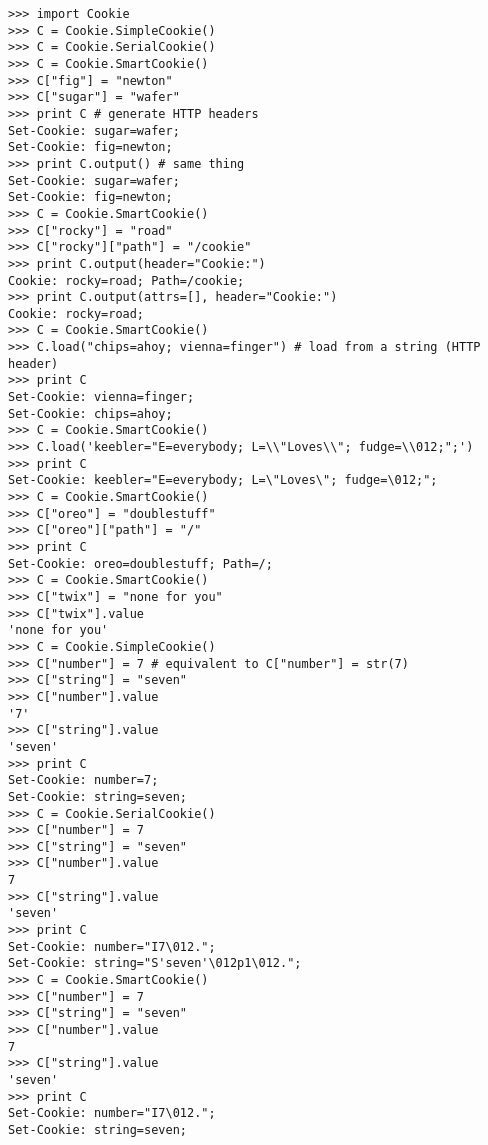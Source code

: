 \begin{verbatim}
>>> import Cookie
>>> C = Cookie.SimpleCookie()
>>> C = Cookie.SerialCookie()
>>> C = Cookie.SmartCookie()
>>> C["fig"] = "newton"
>>> C["sugar"] = "wafer"
>>> print C # generate HTTP headers
Set-Cookie: sugar=wafer;
Set-Cookie: fig=newton;
>>> print C.output() # same thing
Set-Cookie: sugar=wafer;
Set-Cookie: fig=newton;
>>> C = Cookie.SmartCookie()
>>> C["rocky"] = "road"
>>> C["rocky"]["path"] = "/cookie"
>>> print C.output(header="Cookie:")
Cookie: rocky=road; Path=/cookie;
>>> print C.output(attrs=[], header="Cookie:")
Cookie: rocky=road;
>>> C = Cookie.SmartCookie()
>>> C.load("chips=ahoy; vienna=finger") # load from a string (HTTP header)
>>> print C
Set-Cookie: vienna=finger;
Set-Cookie: chips=ahoy;
>>> C = Cookie.SmartCookie()
>>> C.load('keebler="E=everybody; L=\\"Loves\\"; fudge=\\012;";')
>>> print C
Set-Cookie: keebler="E=everybody; L=\"Loves\"; fudge=\012;";
>>> C = Cookie.SmartCookie()
>>> C["oreo"] = "doublestuff"
>>> C["oreo"]["path"] = "/"
>>> print C
Set-Cookie: oreo=doublestuff; Path=/;
>>> C = Cookie.SmartCookie()
>>> C["twix"] = "none for you"
>>> C["twix"].value
'none for you'
>>> C = Cookie.SimpleCookie()
>>> C["number"] = 7 # equivalent to C["number"] = str(7)
>>> C["string"] = "seven"
>>> C["number"].value
'7'
>>> C["string"].value
'seven'
>>> print C
Set-Cookie: number=7;
Set-Cookie: string=seven;
>>> C = Cookie.SerialCookie()
>>> C["number"] = 7
>>> C["string"] = "seven"
>>> C["number"].value
7
>>> C["string"].value
'seven'
>>> print C
Set-Cookie: number="I7\012.";
Set-Cookie: string="S'seven'\012p1\012.";
>>> C = Cookie.SmartCookie()
>>> C["number"] = 7
>>> C["string"] = "seven"
>>> C["number"].value
7
>>> C["string"].value
'seven'
>>> print C
Set-Cookie: number="I7\012.";
Set-Cookie: string=seven;
\end{verbatim}
